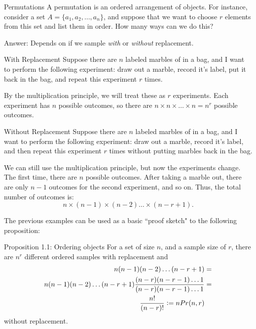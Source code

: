 \begin{frame}[allowframebreaks]{Permutations}
  A \alert{permutation} is an ordered arrangement of objects.
  For instance, consider a set $A = \{a_1, a_2, \ldots, a_n\}$, and suppose that we want to choose $r$ elements from this set and list them in order. How many ways can we do this? 
  
  Answer: Depends on if we sample \emph{with} or \emph{without} replacement.
  
  \begin{block}{With Replacement}
    Suppose there are $n$ labeled marbles of in a bag, and I want to perform the following experiment: draw out a marble, record it's label, put it back in the bag, and repeat this experiment $r$ times.
    
    By the multiplication principle, we will treat these as $r$ experiments. Each experiment has $n$ possible outcomes, so there are $n \times n \times \ldots \times n = n^r$ possible outcomes.
  \end{block}
  
    \begin{block}{Without Replacement}
    Suppose there are $n$ labeled marbles of in a bag, and I want to perform the following experiment: draw out a marble, record it's label, and then repeat this experiment $r$ times without putting marbles back in the bag.
    
    We can still use the multiplication principle, but now the experiments change. The first time, there are $n$ possible outcomes. After taking a marble out, there are only $n-1$ outcomes for the second experiment, and so on. Thus, the total number of outcomes is: 
    $$n \times (n-1) \times (n-2) \ldots \times (n-r+1).$$
  \end{block}
  
  The previous examples can be used as a basic ``proof sketch" to the following proposition:
  
  \begin{block}{Proposition 1.1: Ordering objects}
    For a set of size $n$, and a sample size of $r$, there are $n^r$ different ordered samples with replacement and
    \begin{align*}
    n(n-1)(n-2)\ldots(n-r+1) &= \\
    n(n-1)(n-2)\ldots(n-r+1)\frac{(n-r)(n-r-1)\ldots 1}{(n-r)(n-r-1)\ldots 1} &=\\
    \frac{n!}{(n-r)!} \vcentcolon= nPr(n, r) &
    \end{align*}
    without replacement.
  \end{block}
  

\end{frame}
